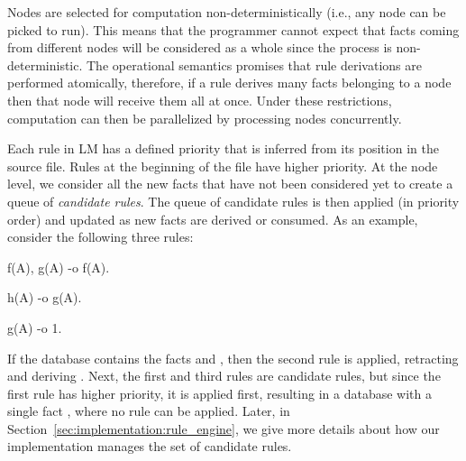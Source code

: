 
Nodes are selected for computation non-deterministically (i.e., any node can be
picked to run). This means that the programmer cannot expect that facts coming
from different nodes will be considered as a whole since the process is
non-deterministic. The operational semantics promises that rule derivations are
performed atomically, therefore, if a rule derives many facts belonging to a node
then that node will receive them all at once. Under these restrictions,
computation can then be parallelized by processing nodes concurrently.

Each rule in LM has a defined priority that is inferred from its position in the
source file. Rules at the beginning of the file have higher priority. At the
node level, we consider all the new facts that have not been considered yet to
create a queue of \emph{candidate rules}. The queue of candidate rules
is then applied (in priority order) and updated as new facts are derived or
consumed. As an example, consider the following three rules:

\begin{Code}
f(A), g(A) -o f(A).

h(A) -o g(A).

g(A) -o 1.
\end{Code}

If the database contains the facts  and , then the
second rule is applied, retracting  and deriving . Next,
the first and third rules are candidate rules, but since the first rule has
higher priority, it is applied first, resulting in a database with a single fact
, where no rule can be applied. Later, in
Section~\ref{sec:implementation:rule_engine}, we give more details about how our
implementation manages the set of candidate rules.

